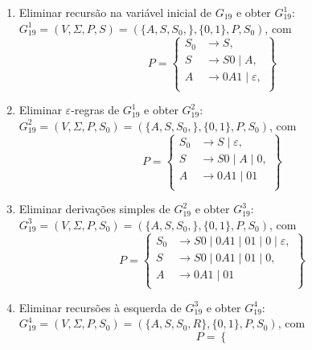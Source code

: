 \documentclass[12pt]{article}
\def\myling{{19}} %
\newcommand{\ve}{\ensuremath{\varepsilon}}
\begin{document}
\begin{tcolorbox}[breakable,rounded corners, colback=yellow!5, colframe=red!40!black, title={Transformações em $G_{\myling}$.}]
\begin{enumerate}
  \item Eliminar recursão na variável inicial de $G_{\myling}$ e obter $G_{\myling}^1$:\\
  $G_{\myling}^1=(V,\Sigma,P,S)=(\{A,S,S_0,\},\{0,1\}, P, S_0)$, com
    \[P=\left\{
     \begin{aligned}
      S_0 & \to S,\\
      S & \to S0\mid A, \\
      A & \to 0A1\mid \ve, \\
     \end{aligned}
    \right\}\]
  \item Eliminar $\ve$-regras de $G_{\myling}^1$ e obter $G_{\myling}^2$:\\
  $G_{\myling}^2=(V,\Sigma,P,S_0)=(\{A,S,S_0,\},\{0,1\}, P, S_0)$, com
    \[P=\left\{
     \begin{aligned}
      S_0 & \to S \mid \ve,\\
      S & \to S0\mid A \mid 0, \\
      A & \to 0A1 \mid 01 \\
     \end{aligned}
    \right\}\]
  \item Eliminar derivações simples de $G_{\myling}^2$ e obter $G_{\myling}^3$:\\
  $G_{\myling}^3=(V,\Sigma,P,S_0)=(\{A,S,S_0,\},\{0,1\}, P, S_0)$, com
    \[P=\left\{
     \begin{aligned}
      S_0 & \to S0\mid 0A1 \mid 01 \mid 0 \mid \ve,\\
      S & \to S0 \mid 0A1 \mid 01 \mid 0, \\
      A & \to 0A1 \mid 01 \\
     \end{aligned}
    \right\}\]
  \item Eliminar recursões à esquerda de $G_{\myling}^3$ e obter $G_{\myling}^4$:\\
  $G_{\myling}^4=(V,\Sigma,P,S_0)=(\{A,S,S_0,R\},\{0,1\}, P, S_0)$, com
    \[P=\left\{
\]
\end{enumerate}
\end{tcolorbox}
\end{document}
